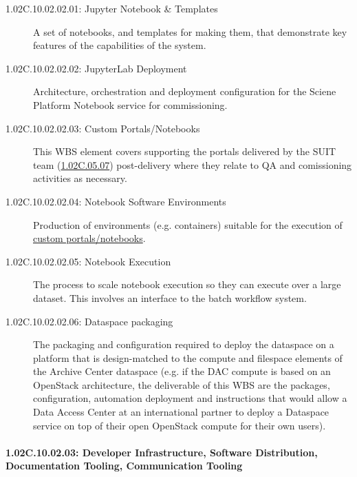 \begin{description}

\item[1.02C.10.02.02.01: Jupyter Notebook \& Templates]
  A set of notebooks, and templates for making them, that demonstrate key
  features of the capabilities of the system.

\item[1.02C.10.02.02.02: JupyterLab Deployment]
  Architecture, orchestration and deployment configuration for the Sciene
  Platform Notebook service for commissioning.

\item[1.02C.10.02.02.03: Custom Portals/Notebooks]
  \label{wbs:1.02C.10.02.02.03}
  This WBS element covers supporting the portals delivered by the SUIT team
  (\hyperref[wbs:1.02C.05.08]{1.02C.05.07}) post-delivery where they relate to
  QA and comissioning activities as necessary.

\item[1.02C.10.02.02.04: Notebook Software Environments]
  \label{wbs:1.02C.10.02.02.04}
  Production of environments (e.g. containers) suitable for the execution of
  \hyperref[wbs:1.02C.10.02.02.03]{custom portals/notebooks}.

\item[1.02C.10.02.02.05: Notebook Execution]
  The process to scale notebook execution so they can execute over a large
  dataset. This involves an interface to the batch workflow system.

\item[1.02C.10.02.02.06: Dataspace packaging]
  The packaging and configuration required to deploy the dataspace on a
  platform that is design-matched to the compute and filespace elements of the
  Archive Center dataspace (e.g. if the DAC compute is based on an OpenStack
  architecture, the deliverable of this WBS are the packages, configuration,
  automation deployment and instructions that would allow a Data Access Center
  at an international partner to deploy a Dataspace service on top of their
  open OpenStack compute for their own users).

\end{description}

\paragraph*{1.02C.10.02.03: Developer Infrastructure, Software Distribution, Documentation Tooling, Communication Tooling}


